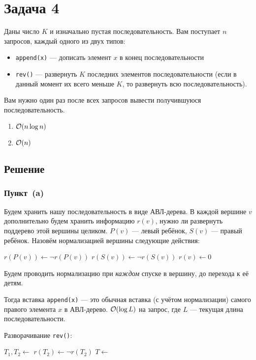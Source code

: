 \section{Задача 4}
Даны число $K$ и изначально пустая последовательность. Вам поступает $n$ запросов, каждый одного из двух типов:
\begin{itemize}
    \item \texttt{append(x)} --- дописать элемент $x$ в конец последовательности
    \item \texttt{rev()} ---
    развернуть $K$ последних элементов последовательности (если в данный момент их всего меньше $K$, то
    развернуть всю последовательность).
\end{itemize}

Вам нужно один раз после всех запросов вывести получившуюся последовательность.
\begin{enumerate}[label=(\alph*)]
    \item $\mathcal{O}(n \log{n})$
    \item $\mathcal{O}(n)$
\end{enumerate}

\subsection{Решение}
\subsubsection{Пункт~(a)}
Будем хранить нашу последовательность в виде АВЛ-дерева.
В каждой вершине $v$ дополнительно будем хранить информацию $r(v)$, нужно ли развернуть поддерево этой вершины целиком.
$P(v)$ --- левый ребёнок, $S(v)$ --- правый ребёнок.
Назовём нормализацией вершины следующие действия:
\begin{algorithmic}
        \State $r(P(v)) \gets \lnot r(P(v))$
        \State $r(S(v)) \gets \lnot r(S(v))$
        \State {}
        \State $r(v) \gets 0$
    \EndIf
\end{algorithmic}

Будем проводить нормализацию при \emph{каждом} спуске в вершину, до перехода к её детям.

Тогда вставка \texttt{append(x)} --- это обычная вставка (с учётом нормализации)
самого правого элемента $x$ в АВЛ-дерево.
$\mathcal{O}(\log L)$ на запрос, где $L$ --- текущая длина последовательности.

Разворачивание \texttt{rev()}:
\begin{algorithmic}
    \State $T_1, T_2 \gets$ 
    \State $r(T_2) \gets \lnot r(T_2)$
    \State $T \gets$ 
\end{algorithmic}

